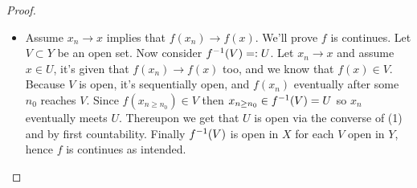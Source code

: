 \documentclass[a4paper]{article}
\newcommand \envendproof{\vspace{-17pt}}
\begin{document}
\begin{proof}
\begin{enumerate}
\begin{itemize}
				\item[$\impliedby$]Assume $x_n \to x$ implies that $f(x_n) \to f(x)$. We'll prove $f$ is continues. Let $V \subset Y$ be an open set. Now consider $f^{-1}(V) =: U$. Let $x_n \to x$ and assume $x \in U$, it's given that $f(x_n) \to f(x)$ too, and we know that $f(x) \in V$. Because $V$ is open, it's sequentially open, and $f(x_n)$ eventually after some $n_0$ reaches $V$. Since $f(x_{n \ge n_0}) \in V$ then $x_{n \ge n_0} \in f^{-1}(V) = U$ so $x_n$ eventually meets $U$. Thereupon we get that $U$ is open via the converse of (1) and by first countability. Finally $f^{-1}(V)$ is open in $X$ for each $V$ open in $Y$, hence $f$ is continues as intended. 
			\end{itemize}\envendproof
		\end{enumerate}
	\end{proof}
	
	
\end{document}
